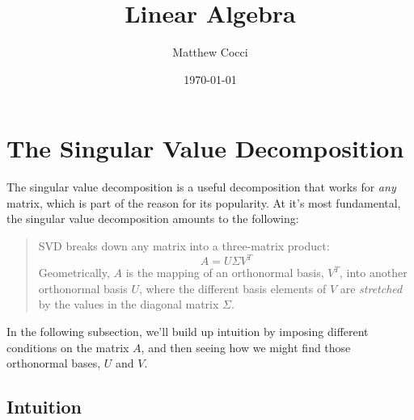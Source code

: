 \documentclass[12pt]{article}
\author{Matthew Cocci}
\title{Linear Algebra}
\date{\today}
\begin{document}


\section{The Singular Value Decomposition}

The singular value decomposition is a useful decomposition that works for \emph{any} matrix, which is part of the reason for its popularity. At it's most fundamental, the singular value decomposition amounts to the following: 
\begin{quotation}
\noindent
SVD breaks down any matrix into a three-matrix product: 
  \[
    A = U\Sigma V^T
\]
Geometrically, $A$ is the mapping of an orthonormal basis, $V^T$, into another orthonormal basis $U$, where the different basis elements of $V$ are \emph{stretched} by the values in the diagonal matrix $\Sigma$. 
\end{quotation}
In the following subsection, we'll build up intuition by imposing different conditions on the matrix $A$, and then seeing how we might find those orthonormal bases, $U$ and $V$. 


\subsection{Intuition}
\end{document}
